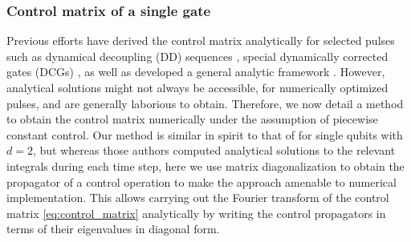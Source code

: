 \subsubsection{Control matrix of a single gate}\label{sec:theory:control_matrix:pulse}
Previous efforts have derived the control matrix analytically for selected pulses such as dynamical decoupling (DD) sequences \cite{Cywinski2008}, special dynamically corrected gates (DCGs) \cite{Gungordu2018}, as well as developed a general analytic framework \cite{Green2012,Green2013}. However, analytical solutions might not always be accessible, \eg for numerically optimized pulses, and are generally laborious to obtain. Therefore, we now detail a method to obtain the control matrix numerically under the assumption of piecewise constant control. Our method is similar in spirit to that of \citeauthor{Green2012} for single qubits with $d=2$, but whereas those authors computed analytical solutions to the relevant integrals during each time step, here we use matrix diagonalization to obtain the propagator of a control operation to make the approach amenable to numerical implementation. This allows carrying out the Fourier transform of the control matrix \cref{eq:control_matrix} analytically by writing the control propagators in terms of their eigenvalues in diagonal form.

